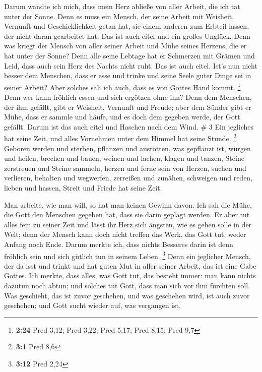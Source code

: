  Darum wandte ich mich, dass mein Herz abließe von aller
Arbeit, die ich tat unter der Sonne.  Denn es muss ein
Mensch, der seine Arbeit mit Weisheit, Vernunft und Geschicklichkeit
getan hat, sie einem anderen zum Erbteil lassen, der nicht daran
gearbeitet hat. Das ist auch eitel und ein großes Unglück.
 Denn was kriegt der Mensch von aller seiner Arbeit und
Mühe seines Herzens, die er hat unter der Sonne?  Denn
alle seine Lebtage hat er Schmerzen mit Grämen und Leid, dass auch sein
Herz des Nachts nicht ruht. Das ist auch eitel.  Ist's
nun nicht besser dem Menschen, dass er esse und trinke und seine Seele
guter Dinge sei in seiner Arbeit? Aber solches sah ich auch, dass es von
Gottes Hand kommt. \footnote{\textbf{2:24} Pred 3,12; Pred 3,22; Pred
  5,17; Pred 8,15; Pred 9,7}  Denn wer kann fröhlich
essen und sich ergötzen ohne ihn?  Denn dem Menschen, der
ihm gefällt, gibt er Weisheit, Vernunft und Freude; aber dem Sünder gibt
er Mühe, dass er sammle und häufe, und es doch dem gegeben werde, der
Gott gefällt. Darum ist das auch eitel und Haschen nach dem Wind. \# 3
 Ein jegliches hat seine Zeit, und alles Vornehmen unter
dem Himmel hat seine Stunde. \footnote{\textbf{3:1} Pred 8,6}
 Geboren werden und sterben, pflanzen und ausrotten, was
gepflanzt ist,  würgen und heilen, brechen und bauen,
 weinen und lachen, klagen und tanzen, 
Steine zerstreuen und Steine sammeln, herzen und ferne sein von Herzen,
 suchen und verlieren, behalten und wegwerfen,
 zerreißen und zunähen, schweigen und reden,
 lieben und hassen, Streit und Friede hat seine Zeit.

 Man arbeite, wie man will, so hat man keinen Gewinn
davon.  Ich sah die Mühe, die Gott den Menschen gegeben
hat, dass sie darin geplagt werden.  Er aber tut alles
fein zu seiner Zeit und lässt ihr Herz sich ängsten, wie es gehen solle
in der Welt; denn der Mensch kann doch nicht treffen das Werk, das Gott
tut, weder Anfang noch Ende.  Darum merkte ich, dass
nichts Besseres darin ist denn fröhlich sein und sich gütlich tun in
seinem Leben. \footnote{\textbf{3:12} Pred 2,24}  Denn
ein jeglicher Mensch, der da isst und trinkt und hat guten Mut in aller
seiner Arbeit, das ist eine Gabe Gottes.  Ich merkte,
dass alles, was Gott tut, das besteht immer: man kann nichts dazutun
noch abtun; und solches tut Gott, dass man sich vor ihm fürchten soll.
 Was geschieht, das ist zuvor geschehen, und was
geschehen wird, ist auch zuvor geschehen; und Gott sucht wieder auf, was
vergangen ist.

